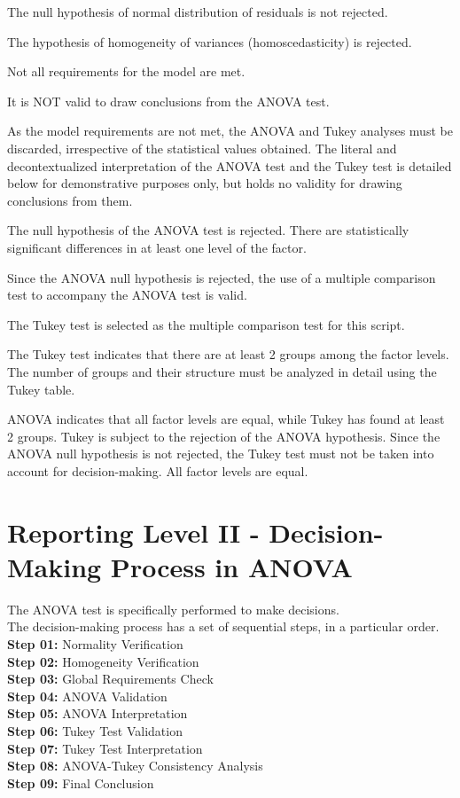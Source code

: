 \documentclass[
  letterpaper,
  DIV=11,
  numbers=noendperiod]{scrartcl}
\begin{document}
The null hypothesis of normal distribution of residuals is not rejected.

The hypothesis of homogeneity of variances (homoscedasticity) is
rejected.

Not all requirements for the model are met.

It is NOT valid to draw conclusions from the ANOVA test.

As the model requirements are not met, the ANOVA and Tukey analyses must
be discarded, irrespective of the statistical values obtained. The
literal and decontextualized interpretation of the ANOVA test and the
Tukey test is detailed below for demonstrative purposes only, but holds
no validity for drawing conclusions from them.

The null hypothesis of the ANOVA test is rejected. There are
statistically significant differences in at least one level of the
factor.

Since the ANOVA null hypothesis is rejected, the use of a multiple
comparison test to accompany the ANOVA test is valid.

The Tukey test is selected as the multiple comparison test for this
script.

The Tukey test indicates that there are at least 2 groups among the
factor levels. The number of groups and their structure must be analyzed
in detail using the Tukey table.

ANOVA indicates that all factor levels are equal, while Tukey has found
at least 2 groups. Tukey is subject to the rejection of the ANOVA
hypothesis. Since the ANOVA null hypothesis is not rejected, the Tukey
test must not be taken into account for decision-making. All factor
levels are equal.

\newpage

\section{Reporting Level II - Decision-Making Process in
ANOVA}\label{reporting-level-ii---decision-making-process-in-anova}

The ANOVA test is specifically performed to make decisions.\\
The decision-making process has a set of sequential steps, in a
particular order.\\
\textbf{Step 01:} Normality Verification\\
\textbf{Step 02:} Homogeneity Verification\\
\textbf{Step 03:} Global Requirements Check\\
\textbf{Step 04:} ANOVA Validation\\
\textbf{Step 05:} ANOVA Interpretation\\
\textbf{Step 06:} Tukey Test Validation\\
\textbf{Step 07:} Tukey Test Interpretation\\
\textbf{Step 08:} ANOVA-Tukey Consistency Analysis\\
\textbf{Step 09:} Final Conclusion
\end{document}
